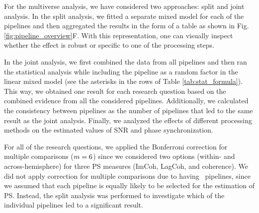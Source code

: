 \medskip

For the multiverse analysis, we have considered two approaches: split and joint analysis. In the split analysis, we fitted a separate mixed model for each of the pipelines and then aggregated the results in the form of a table as shown in Fig. \ref{fig:pipeline_overview}F. With this representation, one can visually inspect whether the effect is robust or specific to one of the processing steps.

\medskip

In the joint analysis, we first combined the data from all pipelines and then ran the statistical analysis while including the pipeline as a random factor in the linear mixed model (see the asterisks in the rows of Table \ref{tab:stat_formula}). This way, we obtained one result for each research question based on the combined evidence from all the considered pipelines. Additionally, we calculated the consistency between pipelines as the number of pipelines that led to the same result as the joint analysis. Finally, we analyzed the effects of different processing methods on the estimated values of SNR and phase synchronization.

\medskip

For all of the research questions, we applied the Bonferroni correction for multiple comparisons ($m=6$) since we considered two options (within- and across-hemisphere) for three PS measures (ImCoh, LagCoh, and coherence). We did not apply correction for multiple comparisons due to having \numPipelines~pipelines, since we assumed that each pipeline is equally likely to be selected for the estimation of PS. Instead, the split analysis was performed to investigate which of the individual pipelines led to a significant result.
